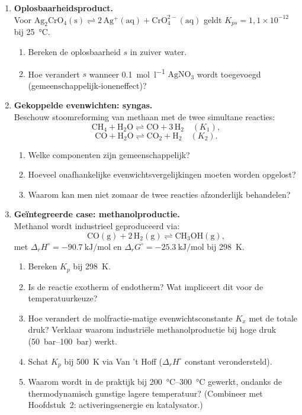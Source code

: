 \begin{enumerate}
\item \textbf{Oplosbaarheidsproduct.} \\
Voor $\mathrm{Ag_2CrO_4(s) \rightleftharpoons 2\,Ag^+(aq) + CrO_4^{2-}(aq)}$ geldt $K_{ps} = 1{,}1 \times 10^{-12}$ bij \SI{25}{\celsius}.
\begin{enumerate}
\item[(a)] Bereken de oplosbaarheid $s$ in zuiver water.
\item[(b)] Hoe verandert $s$ wanneer \SI{0.1}{\mole\per\litre} $\mathrm{AgNO_3}$ wordt toegevoegd (gemeenschappelijk-ioneneffect)?
\end{enumerate}

\item \textbf{Gekoppelde evenwichten: syngas.} \\
Beschouw stoomreforming van methaan met de twee simultane reacties:
\[
\mathrm{CH_4 + H_2O \rightleftharpoons CO + 3\,H_2} \quad (K_1),
\]
\[
\mathrm{CO + H_2O \rightleftharpoons CO_2 + H_2} \quad (K_2).
\]
\begin{enumerate}
\item[(a)] Welke componenten zijn gemeenschappelijk?
\item[(b)] Hoeveel onafhankelijke evenwichtsvergelijkingen moeten worden opgelost?
\item[(c)] Waarom kan men niet zomaar de twee reacties afzonderlijk behandelen?
\end{enumerate}

\item \textbf{Ge\"integreerde case: methanolproductie.} \\
Methanol wordt industrieel geproduceerd via:
\[
\mathrm{CO(g) + 2\,H_2(g) \rightleftharpoons CH_3OH(g)},
\]
met $\Delta_r H^\circ = \SI{-90.7}{\kilo\joule\per\mole}$ en $\Delta_r G^\circ = \SI{-25.3}{\kilo\joule\per\mole}$ bij \SI{298}{\kelvin}.
\begin{enumerate}
\item[(a)] Bereken $K_p$ bij \SI{298}{\kelvin}.
\item[(b)] Is de reactie exotherm of endotherm? Wat impliceert dit voor de temperatuurkeuze?
\item[(c)] Hoe verandert de molfractie-matige evenwichtsconstante $K_x$ met de totale druk? Verklaar waarom industri\"ele methanolproductie bij hoge druk (\SIrange{50}{100}{\bar}) werkt.
\item[(d)] Schat $K_p$ bij \SI{500}{\kelvin} via Van 't Hoff ($\Delta_r H^\circ$ constant verondersteld).
\item[(e)] Waarom wordt in de praktijk bij \SIrange{200}{300}{\celsius} gewerkt, ondanks de thermodynamisch gunstige lagere temperatuur? (Combineer met Hoofdstuk~2: activeringsenergie en katalysator.)
\end{enumerate}

\end{enumerate}

